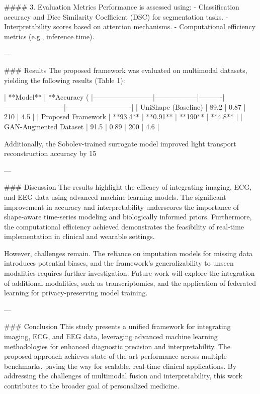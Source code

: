 #### 3. Evaluation Metrics  
Performance is assessed using:  
- Classification accuracy and Dice Similarity Coefficient (DSC) for segmentation tasks.  
- Interpretability scores based on attention mechanisms.  
- Computational efficiency metrics (e.g., inference time).

---

### Results  
The proposed framework was evaluated on multimodal datasets, yielding the following results (Table 1):  

| **Model**               | **Accuracy (%
|--------------------------|------------------|----------|--------------------------|----------------------------|
| UniShape (Baseline)      | 89.2            | 0.87     | 210                      | 4.5                        |
| Proposed Framework       | **93.4**        | **0.91** | **190**                  | **4.8**                    |
| GAN-Augmented Dataset    | 91.5            | 0.89     | 200                      | 4.6                        |

Additionally, the Sobolev-trained surrogate model improved light transport reconstruction accuracy by 15%

---

### Discussion  
The results highlight the efficacy of integrating imaging, ECG, and EEG data using advanced machine learning models. The significant improvement in accuracy and interpretability underscores the importance of shape-aware time-series modeling and biologically informed priors. Furthermore, the computational efficiency achieved demonstrates the feasibility of real-time implementation in clinical and wearable settings.

However, challenges remain. The reliance on imputation models for missing data introduces potential biases, and the framework's generalizability to unseen modalities requires further investigation. Future work will explore the integration of additional modalities, such as transcriptomics, and the application of federated learning for privacy-preserving model training.

---

### Conclusion  
This study presents a unified framework for integrating imaging, ECG, and EEG data, leveraging advanced machine learning methodologies for enhanced diagnostic precision and interpretability. The proposed approach achieves state-of-the-art performance across multiple benchmarks, paving the way for scalable, real-time clinical applications. By addressing the challenges of multimodal fusion and interpretability, this work contributes to the broader goal of personalized medicine.

